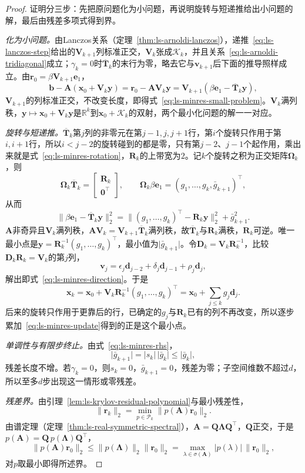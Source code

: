 \begin{proof}
证明分三步：先把原问题化为小问题，再说明旋转与短递推给出小问题的解，最后由残差多项式得到界。

\emph{化为小问题。}由Lanczos关系（定理~\ref{thm:ls-arnoldi-lanczos}），递推~\eqref{eq:ls-lanczos-step}给出的$\bm V_{k+1}$列标准正交，$\bm V_k$张成$\mathcal K_k$，并且关系~\eqref{eq:ls-arnoldi-tridiagonal}成立；$\gamma_k=0$时$\overline{\bm T}_k$的末行为零，略去它与$\bm v_{k+1}$后下面的推导照样成立。由$\bm r_0=\beta\bm V_{k+1}\bm e_1$，
\[
 \bm b-\bm A(\bm x_0+\bm V_k\bm y)=\bm r_0-\bm A\bm V_k\bm y=\bm V_{k+1}(\beta\bm e_1-\overline{\bm T}_k\bm y),
\]
$\bm V_{k+1}$的列标准正交，不改变长度，即得式~\eqref{eq:ls-minres-small-problem}。$\bm V_k$满列秩，$\bm y\mapsto\bm x_0+\bm V_k\bm y$是$\mathbb R^k$到$\bm x_0+\mathcal K_k$的双射，两个最小化问题的解一一对应。

\emph{旋转与短递推。}$\overline{\bm T}_k$第$j$列的非零元在第$j-1,j,j+1$行，第$i$个旋转只作用于第$i,i+1$行，所以$i<j-2$的旋转碰到的都是零，只有第$j-2$、$j-1$个起作用，乘出来就是式~\eqref{eq:ls-minres-rotation}，$\bm R_k$的上带宽为$2$。记$k$个旋转之积为正交矩阵$\bm\Omega_k$，则
\[
 \bm\Omega_k\overline{\bm T}_k=\begin{bmatrix}\bm R_k\\\bm 0^\top\end{bmatrix},\qquad
 \bm\Omega_k\beta\bm e_1=(g_1,\ldots,g_k,\bar g_{k+1})^\top ,
\]
从而
\[
 \lVert\beta\bm e_1-\overline{\bm T}_k\bm y\rVert_2^2=\lVert(g_1,\ldots,g_k)^\top-\bm R_k\bm y\rVert_2^2+\bar g_{k+1}^2 .
\]
$\bm A$非奇异且$\bm V_k$满列秩，$\bm A\bm V_k=\bm V_{k+1}\overline{\bm T}_k$满列秩，故$\overline{\bm T}_k$与$\bm R_k$满秩，$\bm R_k$可逆。唯一最小点是$\bm y=\bm R_k^{-1}(g_1,\ldots,g_k)^\top$，最小值为$\lvert\bar g_{k+1}\rvert$。令$\bm D_k=\bm V_k\bm R_k^{-1}$，比较$\bm D_k\bm R_k=\bm V_k$的第$j$列，
\[
 \bm v_j=\epsilon_j\bm d_{j-2}+\delta_j\bm d_{j-1}+\rho_j\bm d_j ,
\]
解出即式~\eqref{eq:ls-minres-direction}。于是
\[
 \bm x_k=\bm x_0+\bm V_k\bm R_k^{-1}(g_1,\ldots,g_k)^\top=\bm x_0+\sum_{j\le k}g_j\bm d_j .
\]
后来的旋转只作用于更靠后的行，已确定的$g_j$与$\bm R_k$已有的列不再改变，所以逐步累加~\eqref{eq:ls-minres-update}得到的正是这个最小点。

\emph{单调性与有限步终止。}由式~\eqref{eq:ls-minres-rhs}，
\[
 \lvert\bar g_{k+1}\rvert=\lvert s_k\rvert\,\lvert\bar g_k\rvert\le\lvert\bar g_k\rvert ,
\]
残差长度不增。若$\gamma_k=0$，则$s_k=0$，$\bar g_{k+1}=0$，残差为零；子空间维数不超过$d$，所以至多$d$步出现这一情形或零残差。

\emph{残差界。}由引理~\ref{lem:ls-krylov-residual-polynomial}与最小残差性，
\[
 \lVert\bm r_k\rVert_2=\min_{p\in\mathcal P_k}\lVert p(\bm A)\bm r_0\rVert_2 .
\]
由谱定理（定理~\ref{thm:ls-real-symmetric-spectral}），$\bm A=\bm Q\bm\Lambda\bm Q^\top$，$\bm Q$正交，于是$p(\bm A)=\bm Q\,p(\bm\Lambda)\bm Q^\top$，
\[
 \lVert p(\bm A)\bm r_0\rVert_2\le\lVert p(\bm\Lambda)\rVert_2\lVert\bm r_0\rVert_2=\max_{\lambda\in\sigma(\bm A)}\lvert p(\lambda)\rvert\,\lVert\bm r_0\rVert_2 ,
\]
对$p$取最小即得所述界。
\end{proof}

